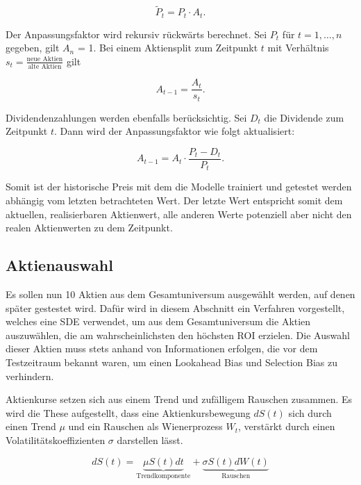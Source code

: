 \[
    \tilde{P}_t = P_t \cdot A_t .
\]

Der Anpassungsfaktor wird rekursiv rückwärts berechnet. Sei \(P_t\) für \(t=1,\dots,n\) gegeben, gilt \(A_n\) = 1. Bei einem Aktiensplit zum Zeitpunkt \(t\) mit Verhältnis
\(s_t = \frac{\text{neue Aktien}}{\text{alte Aktien}}\) gilt

\[
    A_{t-1} = \frac{A_t}{s_t}.
\]

Dividendenzahlungen werden ebenfalls berücksichtig. Sei \(D_t\) die Dividende zum Zeitpunkt \(t\). Dann wird der Anpassungsfaktor wie folgt aktualisiert:

\[
    A_{t-1} = A_t \cdot \frac{P_t - D_t}{P_t}.
\]


Somit ist der historische Preis mit dem die Modelle trainiert und getestet werden abhängig vom letzten betrachteten Wert. Der letzte Wert entspricht somit dem aktuellen, realisierbaren Aktienwert, alle anderen Werte potenziell aber nicht den realen Aktienwerten zu dem Zeitpunkt.

\subsection{Aktienauswahl}\label{subsec:aktienauswahl}
Es sollen nun 10 Aktien aus dem Gesamtuniversum ausgewählt werden, auf denen später gestestet wird. Dafür wird in diesem Abschnitt ein Verfahren vorgestellt, welches eine \ac{SDE} verwendet, um aus dem Gesamtuniversum die Aktien auszuwählen, die am wahrscheinlichsten den höchsten \ac{ROI} erzielen. Die Auswahl dieser Aktien muss stets anhand von Informationen erfolgen, die vor dem Testzeitraum bekannt waren, um einen Lookahead Bias und Selection Bias zu verhindern.


Aktienkurse setzen sich aus einem Trend und zufälligem Rauschen zusammen. Es wird die These aufgestellt, dass eine Aktienkursbewegung $dS(t)$ sich durch einen Trend $\mu$ und ein Rauschen als Wienerprozess $W_t$, verstärkt durch einen Volatilitätskoeffizienten $\sigma$ darstellen lässt.

\begin{equation}\label{eq:sde}
    dS(t) = \underbrace{\mu S(t) dt}_{\text{Trendkomponente}} + \underbrace{\sigma S(t)dW(t)}_{\text{Rauschen}}
\end{equation}



